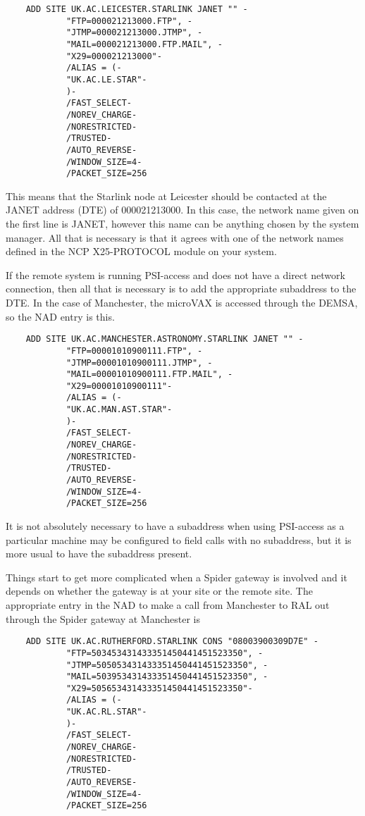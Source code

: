 \begin{verbatim}
    ADD SITE UK.AC.LEICESTER.STARLINK JANET "" -
            "FTP=000021213000.FTP", -
            "JTMP=000021213000.JTMP", -
            "MAIL=000021213000.FTP.MAIL", -
            "X29=000021213000"-
            /ALIAS = (-
            "UK.AC.LE.STAR"-
            )-
            /FAST_SELECT-
            /NOREV_CHARGE-
            /NORESTRICTED-
            /TRUSTED-
            /AUTO_REVERSE-
            /WINDOW_SIZE=4-
            /PACKET_SIZE=256
\end{verbatim}

This means that the Starlink node at Leicester should be contacted at the JANET
address (DTE) of 000021213000. In this case, the network name given on the
first line is JANET, however this name can be anything chosen by the system
manager. All that is necessary is that it agrees with one of the network names
defined in the NCP X25-PROTOCOL module on your system.

If the remote system is running PSI-access and does not have a direct network
connection, then all that is necessary is to add the appropriate subaddress to
the DTE. In the case of Manchester, the microVAX is accessed through the DEMSA,
so the NAD entry is this.

\begin{verbatim}
    ADD SITE UK.AC.MANCHESTER.ASTRONOMY.STARLINK JANET "" -
            "FTP=00001010900111.FTP", -
            "JTMP=00001010900111.JTMP", -
            "MAIL=00001010900111.FTP.MAIL", -
            "X29=00001010900111"-
            /ALIAS = (-
            "UK.AC.MAN.AST.STAR"-
            )-
            /FAST_SELECT-
            /NOREV_CHARGE-
            /NORESTRICTED-
            /TRUSTED-
            /AUTO_REVERSE-
            /WINDOW_SIZE=4-
            /PACKET_SIZE=256
\end{verbatim}

It is not absolutely necessary to have a subaddress when using PSI-access as a
particular machine may be configured to field calls with no subaddress, but it
is more usual to have the subaddress present.

Things start to get more complicated when a Spider gateway is involved and it
depends on whether the gateway is at your site or the remote site. The
appropriate entry in the NAD to make a call from Manchester to RAL out through
the Spider gateway at Manchester is  

\begin{verbatim}
    ADD SITE UK.AC.RUTHERFORD.STARLINK CONS "08003900309D7E" -
            "FTP=503453431433351450441451523350", -
            "JTMP=505053431433351450441451523350", -
            "MAIL=503953431433351450441451523350", -
            "X29=505653431433351450441451523350"-
            /ALIAS = (-
            "UK.AC.RL.STAR"-
            )-
            /FAST_SELECT-
            /NOREV_CHARGE-
            /NORESTRICTED-
            /TRUSTED-
            /AUTO_REVERSE-
            /WINDOW_SIZE=4-
            /PACKET_SIZE=256
\end{verbatim} 

